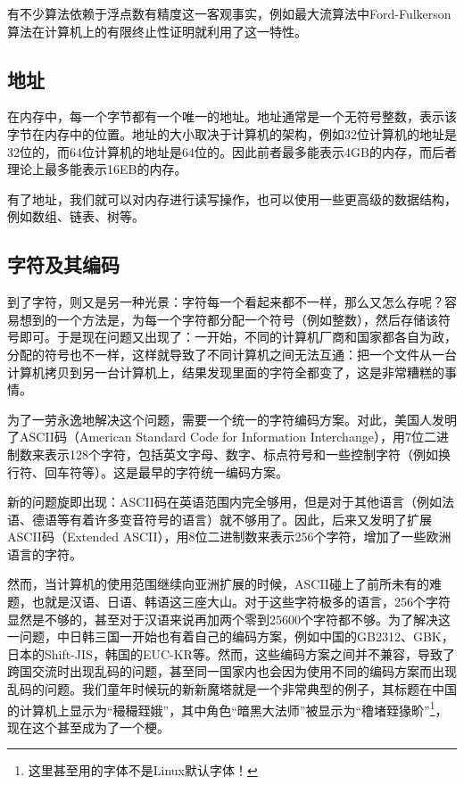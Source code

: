 \documentclass[../main.tex]{subfiles}
\begin{document}
有不少算法依赖于浮点数有精度这一客观事实，例如最大流算法中Ford-Fulkerson算法在计算机上的有限终止性证明就利用了这一特性。

\subsection{地址}

在内存中，每一个字节都有一个唯一的地址。地址通常是一个无符号整数，表示该字节在内存中的位置。地址的大小取决于计算机的架构，例如32位计算机的地址是32位的，而64位计算机的地址是64位的。因此前者最多能表示4GB的内存，而后者理论上最多能表示16EB的内存。

有了地址，我们就可以对内存进行读写操作，也可以使用一些更高级的数据结构，例如数组、链表、树等。

\subsection{字符及其编码}

到了字符，则又是另一种光景：字符每一个看起来都不一样，那么又怎么存呢？容易想到的一个方法是，为每一个字符都分配一个符号（例如整数），然后存储该符号即可。于是现在问题又出现了：一开始，不同的计算机厂商和国家都各自为政，分配的符号也不一样，这样就导致了不同计算机之间无法互通：把一个文件从一台计算机拷贝到另一台计算机上，结果发现里面的字符全都变了，这是非常糟糕的事情。

为了一劳永逸地解决这个问题，需要一个统一的字符编码方案。对此，美国人发明了ASCII码（American Standard Code for Information Interchange），用7位二进制数来表示128个字符，包括英文字母、数字、标点符号和一些控制字符（例如换行符、回车符等）。这是最早的字符统一编码方案。

新的问题旋即出现：ASCII码在英语范围内完全够用，但是对于其他语言（例如法语、德语等有着许多变音符号的语言）就不够用了。因此，后来又发明了扩展ASCII码（Extended ASCII），用8位二进制数来表示256个字符，增加了一些欧洲语言的字符。

然而，当计算机的使用范围继续向亚洲扩展的时候，ASCII碰上了前所未有的难题，也就是汉语、日语、韩语这三座大山。对于这些字符极多的语言，256个字符显然是不够的，甚至对于汉语来说再加两个零到25600个字符都不够。为了解决这一问题，中日韩三国一开始也有着自己的编码方案，例如中国的GB2312、GBK，日本的Shift-JIS，韩国的EUC-KR等。然而，这些编码方案之间并不兼容，导致了跨国交流时出现乱码的问题，甚至同一国家内也会因为使用不同的编码方案而出现乱码的问题。我们童年时候玩的新新魔塔就是一个非常典型的例子，其标题在中国的计算机上显示为“{\rare 穝穝臸娥}”，其中角色“暗黑大法师”被显示为“{\rare 穞堵臸猭畍}”\footnote{这里甚至用的字体不是Linux默认字体！}，现在这个甚至成为了一个梗。
\end{document}
